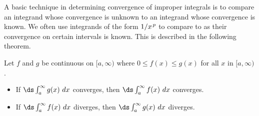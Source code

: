 A basic technique in determining convergence of improper integrals is to compare an integrand whose convergence is unknown to an integrand whose convergence is known. We often use integrands of the form $1/x\hskip1pt ^p$ to compare to as their convergence on certain intervals is known. This is described in the following theorem.


\setboxwidth{30pt}%
{%
Let $f$ and $g$ be continuous on $[a,\infty)$ where $0\leq f(x)\leq g(x)$ for all $x$ in $[a,\infty)$. 
	\begin{itemize}
	\item		If $\ds \int_a^\infty g(x)\ dx$ converges, then $\ds \int_a^\infty f(x)\ dx$ converges.
	\item		If $\ds \int_a^\infty f(x)\ dx$ diverges, then $\ds \int_a^\infty g(x)\ dx$ diverges.
	\end{itemize}

}
\restoreboxwidth

